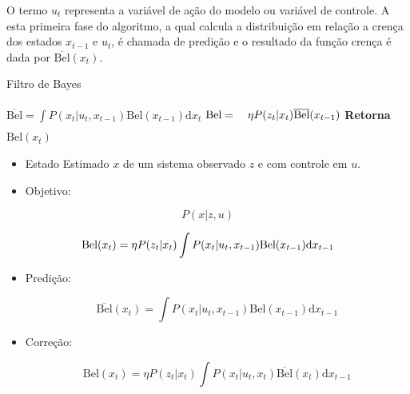 O termo $u_t$ representa a variável de ação do modelo ou variável de controle. A esta primeira fase do algoritmo, a qual calcula a distribuição em relação a crença dos estados $x_{t-1}$ e $u_t$, é chamada de predição e o resultado da função crença é dada por $\overline{\text{Bel}}(x_t)$.



\begin{algorithm}[H]
    \caption{Filtro de Bayes}
    \begin{algorithmic}[1]
        \State $\overline{\text{Bel}}= \displaystyle\int P(x_t| u_t, x_{t-1})\text{Bel}(x_{t-1})\text{d}x_t$
    \EndProcedure
        \State ${\text{Bel}}= \displaystyle\textcolor{white}{\int}  \eta P(z_t| x_{t})\overline{\text{Bel}}(x_{t-1})$
    \EndProcedure
    \State \textbf{Retorna} $\text{Bel}(x_t)$
    \end{algorithmic}
\end{algorithm}


  \begin{itemize}
    \item Estado Estimado $x$ de um sistema observado $z$ e com controle em $u$.
    \item Objetivo:
  \end{itemize}

  \begin{equation}
    P(x|z,u)
  \end{equation}

 

\begin{equation*}
    \text{\text{Bel}}(x_t) = \eta P(z_t| x_t) \int P(x_t| u_t, x_{t-1}) \text{Bel}(x_{t-1})\text{d}x_{t-1}
\end{equation*}


    \begin{itemize}
        \item Predição:
        
        \begin{equation*}
            \overline{\text{Bel}}(x_t) = \int P(x_t| u_t, x_{t-1}) \text{Bel}(x_{t-1})\text{d}x_{t-1}
        \end{equation*}

        \item Correção:

        \begin{equation*}
            \text{Bel}(x_t) = \eta P(z_t| x_t) \int P(x_t| u_t, x_{t}) \overline{\text{Bel}}(x_{t})\text{d}x_{t-1}
        \end{equation*}
    \end{itemize}


